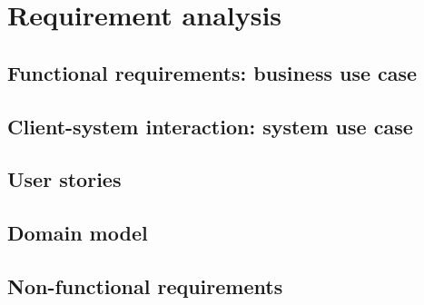 \chapter{Requirement analysis}\label{chapter:requirements-analysis}

\section{Functional requirements: business use case}



\section{Client-system interaction: system use case}



\section{User stories}



\section{Domain model}




\section{Non-functional requirements}
